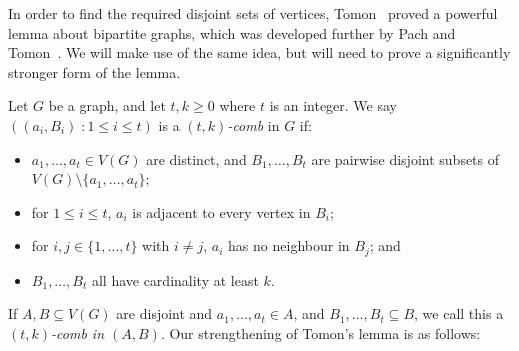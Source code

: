 \documentclass[titlepage,11pt]{article}
\def\ll{,\ldots,}
\begin{document}
In order to find the required disjoint sets of vertices, Tomon~\cite{tomon} proved a powerful lemma about bipartite graphs, which was developed further by Pach and Tomon~\cite{pach}.  We will make use of the same idea, but will need to prove a significantly stronger form of the lemma.

Let $G$ be a graph, and let $t,k\ge 0$ where $t$ is an integer. We say $((a_i,B_i)\;:1\le i\le t)$ is a {\em $(t,k)$-comb} in $G$
if:
\begin{itemize}
\item $a_1\ll a_t\in V(G)$ are distinct, and $B_1\ll B_t$ are pairwise disjoint subsets of $V(G)\setminus \{a_1\ll a_t\}$;
\item for $1\le i\le t$, $a_i$ is adjacent to every vertex in $B_i$;
\item for $i,j\in \{1\ll t\}$ with $i\ne j$, $a_i$ has no neighbour in $B_j$; and
\item $B_1\ll B_t$ all have cardinality at least $k$.
\end{itemize}
If $A,B\subseteq V(G)$ are disjoint and $a_1\ll a_t\in A$, and $B_1\ll B_t\subseteq B$, we call this a {\em $(t,k)$-comb in $(A,B)$}.
Our strengthening of Tomon's lemma \cite{tomon} is as follows:
\end{document}
